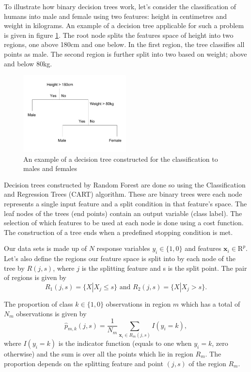 To illustrate how binary decision trees work, let's consider the classification of humans into male and female using two features: height in centimetres and weight in kilograms. An example of a decision tree applicable for such a problem is given in figure \ref{fig:extree}. The root node splits the features space of height into two regions, one above 180cm and one below. In the first region, the tree classifies all points as male. The second region is further split into two based on weight; above and below 80kg. 
\begin{figure}
\centering
	\includegraphics[width=0.5\textwidth]{Example-Decision-Tree}
	\caption{An example of a decision tree constructed for the classification to males and females}
	\label{fig:extree}
\end{figure}

Decision trees constructed by Random Forest are done so using the Classification and Regression Trees (CART) algorithm. These are binary trees were each node represents a single input feature and a split condition in that feature's space. The leaf nodes of the trees (end points) contain an output variable (class label). The selection of which features to be used at each node is done using a cost function. The construction of a tree ends when a predefined stopping condition is met.


Our data sets is made up of $N$ response variables $y_i \in \{1,0\}$ and features $\mathbf{x}_i \in \mathrm{R}^p$. Let's also define the regions our feature space is split into by each node of the tree by $R(j,s)$, where $j$ is the splitting feature and s is the split point. The pair of regions is given by 
\begin{equation}
	R_1(j,s) = \{X|X_j \leq s\} \text{ and } 	R_2(j,s) = \{X|X_j > s\}.  
\end{equation}

The proportion of class $k \in \{1,0\}$ observations in region $m$ which has a total of $N_m$ observations is given by
\begin{equation}
	\hat{p}_{m,k}(j,s) = \frac{1}{N_m} \sum_{\mathbf{x}_i \in R_m(j,s)} I(y_i = k), 
\end{equation}
where $I(y_i=k)$ is the indicator function (equals to one when $y_i =k$, zero otherwise) and the sum is over all the points which lie in region $R_m$. The proportion depends on the splitting feature and point $(j,s)$ of the region $R_m$.


